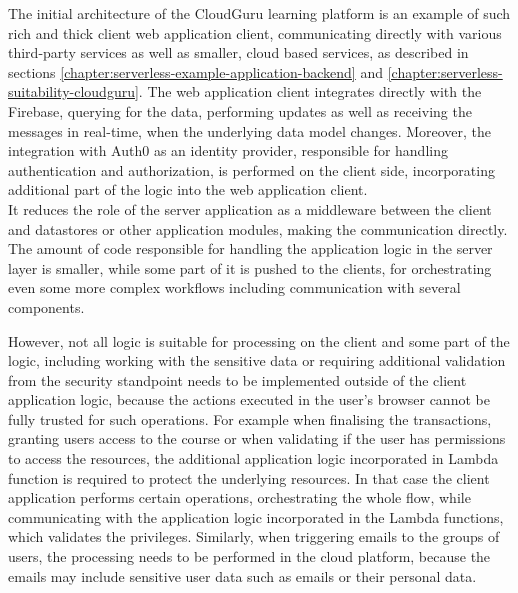 The initial architecture of the CloudGuru learning platform is an example of such rich and thick client web application client, communicating directly with various third-party services as well as smaller, cloud based services, as described in sections \ref{chapter:serverless-example-application-backend} and \ref{chapter:serverless-suitability-cloudguru}.
The web application client integrates directly with the Firebase, querying for the data, performing updates as well as receiving the messages in real-time, when the underlying data model changes.
Moreover, the integration with Auth0 as an identity provider, responsible for handling authentication and authorization, is performed on the client side, incorporating additional part of the logic into the web application client. \\

It reduces the role of the server application as a middleware between the client and datastores or other application modules, making the communication directly.
The amount of code responsible for handling the application logic in the server layer is smaller, while some part of it is pushed to the clients, for orchestrating even some more complex workflows including communication with several components.

However, not all logic is suitable for processing on the client and some part of the logic, including working with the sensitive data or requiring additional validation from the security standpoint needs to be implemented outside of the client application logic, because the actions executed in the user's browser cannot be fully trusted for such operations.
For example when finalising the transactions, granting users access to the course or when validating if the user has permissions to access the resources, the additional application logic incorporated in Lambda function is required to protect the underlying resources.
In that case the client application performs certain operations, orchestrating the whole flow, while communicating with the application logic incorporated in the Lambda functions, which validates the privileges.
Similarly, when triggering emails to the groups of users, the processing needs to be performed in the cloud platform, because the emails may include sensitive user data such as emails or their personal data. 

